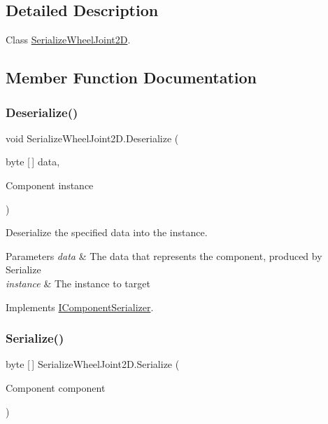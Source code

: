 \subsection{Detailed Description}
Class \hyperlink{class_serialize_wheel_joint2_d}{Serialize\+Wheel\+Joint2D}. 



\subsection{Member Function Documentation}
\mbox{\label{class_serialize_wheel_joint2_d_af4223b135bd9cf9be33639922944f9de}} 
\subsubsection{\texorpdfstring{Deserialize()}{Deserialize()}}
{\footnotesize\ttfamily void Serialize\+Wheel\+Joint2\+D.\+Deserialize (\begin{DoxyParamCaption}\item[{byte \mbox{[}$\,$\mbox{]}}]{data,  }\item[{Component}]{instance }\end{DoxyParamCaption})\hspace{0.3cm}{\ttfamily [inline]}}



Deserialize the specified data into the instance. 


\begin{DoxyParams}{Parameters}
{\em data} & The data that represents the component, produced by Serialize\\
\hline
{\em instance} & The instance to target\\
\hline
\end{DoxyParams}


Implements \hyperlink{interface_i_component_serializer_a4cc366a5c78b33d47a90c209d8fed883}{I\+Component\+Serializer}.

\mbox{\label{class_serialize_wheel_joint2_d_a832d5d2bce3ce68dfb32b5b00fd45719}} 
\subsubsection{\texorpdfstring{Serialize()}{Serialize()}}
{\footnotesize\ttfamily byte \mbox{[}$\,$\mbox{]} Serialize\+Wheel\+Joint2\+D.\+Serialize (\begin{DoxyParamCaption}\item[{Component}]{component }\end{DoxyParamCaption})\hspace{0.3cm}{\ttfamily [inline]}}



